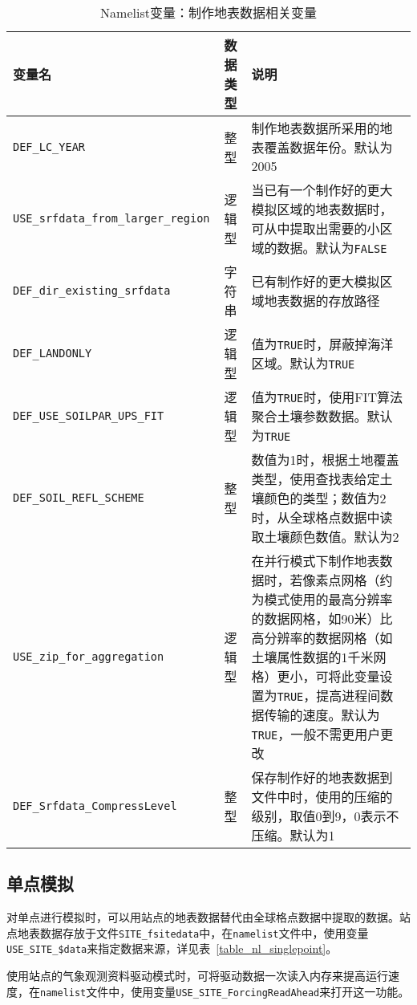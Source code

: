 \begin{table}[!htbp] \small
\caption{Namelist变量：制作地表数据相关变量} \label{table_nl_mksrfdata}
\centering \renewcommand{\arraystretch}{1.2}
\begin{tabular}{lcp{}}
\toprule
\textbf{变量名} & \textbf{数据类型} & \textbf{说明} \\\midrule
\texttt{DEF\_LC\_YEAR} & 整型 & 制作地表数据所采用的地表覆盖数据年份。默认为2005\\
\texttt{USE\_srfdata\_from\_larger\_region} & 逻辑型 & 当已有一个制作好的更大模拟区域的地表数据时，可从中提取出需要的小区域的数据。默认为\texttt{FALSE} \\
\texttt{DEF\_dir\_existing\_srfdata} & 字符串 & 已有制作好的更大模拟区域地表数据的存放路径 \\
\texttt{DEF\_LANDONLY} & 逻辑型 & 值为\texttt{TRUE}时，屏蔽掉海洋区域。默认为\texttt{TRUE} \\
\texttt{DEF\_USE\_SOILPAR\_UPS\_FIT} & 逻辑型 & 值为\texttt{TRUE}时，使用FIT算法聚合土壤参数数据。默认为\texttt{TRUE} \\
\texttt{DEF\_SOIL\_REFL\_SCHEME} & 整型 & 数值为1时，根据土地覆盖类型，使用查找表给定土壤颜色的类型；数值为2时，从全球格点数据中读取土壤颜色数值。默认为2\\
\texttt{USE\_zip\_for\_aggregation} & 逻辑型 & 在并行模式下制作地表数据时，若像素点网格（约为模式使用的最高分辨率的数据网格，如90米）比高分辨率的数据网格（如土壤属性数据的1千米网格）更小，可将此变量设置为\texttt{TRUE}，提高进程间数据传输的速度。默认为\texttt{TRUE}，一般不需更用户更改 \\
\texttt{DEF\_Srfdata\_CompressLevel} & 整型 & 保存制作好的地表数据到文件中时，使用的压缩的级别，取值0到9，0表示不压缩。默认为1\\
\bottomrule
\end{tabular}
\end{table}



\subsection{单点模拟}

对单点进行模拟时，可以用站点的地表数据替代由全球格点数据中提取的数据。站点地表数据存放于文件\texttt{SITE\_fsitedata}中，在\texttt{namelist}文件中，使用变量\texttt{USE\_SITE\_\allowbreak\$data}来指定数据来源，详见表~\ref{table_nl_singlepoint}。

使用站点的气象观测资料驱动模式时，可将驱动数据一次读入内存来提高运行速度，在\texttt{namelist}文件中，使用变量\texttt{USE\_SITE\_ForcingReadAhead}来打开这一功能。

